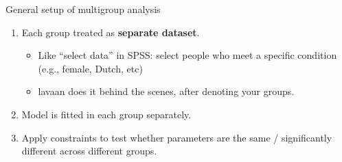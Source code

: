 \documentclass[10pt]{beamer}\usepackage[]{graphicx}\usepackage[]{xcolor}
\begin{document}
%
%
\begin{frame}{General setup of multigroup analysis}
    \begin{enumerate}
        \item Each group treated as \textbf{separate dataset}.
        \begin{itemize}
            \item  Like ``select data'' in SPSS: select people who meet a specific condition (e.g., female, Dutch, etc)
            \item lavaan does it behind the scenes, after denoting your groups.
        \end{itemize}
        \item Model is fitted in each group separately.
        \item Apply constraints to test whether parameters are the same / significantly different across different groups.
    \end{enumerate}
\end{frame}
%
\end{document}

